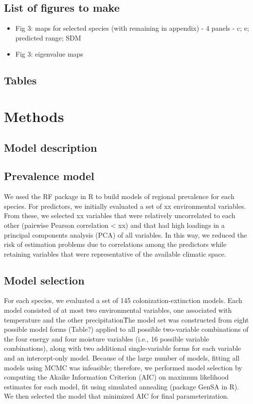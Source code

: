 \documentclass[11pt]{article}
\begin{document}
\subsection*{List of figures to make}
\begin{itemize}
	\item Fig 3: maps for selected species (with remaining in appendix) - 4 panels - c; e; predicted range; SDM
	\item Fig 3: eigenvalue maps
\end{itemize}

\subsection*{Tables}



\section*{Methods}

\subsection*{Model description}

\subsection*{Prevalence model}
We used the RF package in R to build models of regional prevalence for each species. 
For predictors, we initially evaluated a set of xx environmental variables. 
From these, we selected xx variables that were relatively uncorrelated to each other (pairwise Pearson correlation < xx) and that had high loadings in a principal components analysis (PCA) of all variables. 
In this way, we reduced the risk of estimation problems due to correlations among the predictors while retaining variables that were representative of the available climatic space.

\subsection*{Model selection}
For each species, we evaluated a set of 145 colonization-extinction models. 
Each model consisted of at most two environmental variables, one associated with temperature and the other precipitation\. 
The model set was constructed from eight possible model forms (Table?) applied to all possible two-variable combinations of the four energy and four moisture variables (i.e., 16 possible variable combinations), along with two additional single-variable forms for each variable and an intercept-only model. 
Because of the large number of models, fitting all models using MCMC was infeasible; therefore, we performed model selection by computing the Akaike Information Criterion (AIC) on maximum likelihood estimates for each model, fit using simulated annealing (package GenSA in R). 
We then selected the model that minimized AIC for final parameterization.
\end{document}
